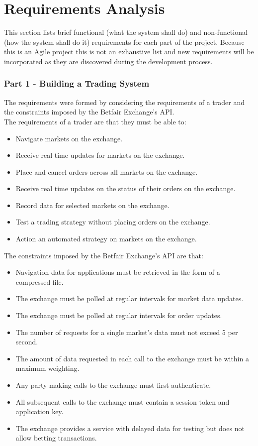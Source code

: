 \chapter{Requirements Analysis}
This section lists brief functional (what the system shall do) and non-functional (how the system shall do it) requirements for each part of the project. Because this is an Agile project this is not an exhaustive list and new requirements will be incorporated as they are discovered during the development process.  

\subsection{Part 1 - Building a Trading System}
The requirements were formed by considering the requirements of a trader and the constraints imposed by the Betfair Exchange's API\cite{betfairAPI}.\\

The requirements of a trader are that they must be able to:

	\begin{itemize}
		\item Navigate markets on the exchange.
		\item Receive real time updates for markets on the exchange.
		\item Place and cancel orders across all markets on the exchange.
		\item Receive real time updates on the status of their orders on the exchange.
		\item Record data for selected markets on the exchange.
		\item Test a trading strategy without placing orders on the exchange.
		\item Action an automated strategy on markets on the exchange.
	\end{itemize}

The constraints imposed by the Betfair Exchange's API are that:

	\begin{itemize}
		\item Navigation data for applications must be retrieved in the form of a compressed file\cite{BetfairNavigationData}.
		\item The exchange must be polled at regular intervals for market data updates.
		\item The exchange must be polled at regular intervals for order updates.
		\item The number of requests for a single market's data must not exceed 5 per second\cite{listMarketBook}.
		\item The amount of data requested in each call to the exchange must be within a maximum weighting\cite{dataRequestLimits}.
		\item Any party making calls to the exchange must first authenticate\cite{loginSessionManagement}.
		\item All subsequent calls to the exchange must contain a session token and application key\cite{ApplicationKeys}.
		\item The exchange provides a service with delayed data for testing but does not allow betting transactions.
	\end{itemize}
		
